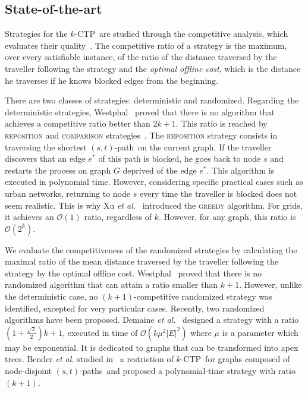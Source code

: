 \documentclass[11pt,letterpaper]{article}
\newcommand{\kctp}{$k$-CTP}
\newcommand{\card}[1]{\left| #1 \right|}
\newcommand{\stpath}{$(s,t)$-path}
\newcommand{\stpaths}{$(s,t)$-paths}
\begin{document}
\subsection{State-of-the-art}
Strategies for the \kctp ~are studied through the competitive analysis, which evaluates their quality~\cite{BoEl98}. The competitive ratio of a strategy is the maximum, over every satisfiable instance, of the ratio of the distance traversed by the traveller following the strategy and the \textit{optimal offline cost}, which is the distance he traverses if he knows blocked edges from the beginning. 

There are two classes of strategies: deterministic and randomized. Regarding the deterministic strategies, Westphal~\cite{We08} proved that there is no algorithm that achieves a competitive ratio better than $2k+1$. This ratio is reached by \textsc{reposition} and \textsc{comparison} strategies~\cite{We08,XuHuSuZh09}. The \textsc{reposition} strategy consists in traversing the shortest \stpath ~on the current graph. If the traveller discovers that an edge $e^*$ of this path is blocked, he goes back to node $s$ and restarts the process on graph $G$ deprived of the edge $e^*$. 
This algorithm is executed in polynomial time. However, considering specific practical cases such as urban networks, returning to node $s$ every time the traveller is blocked does not seem realistic. This is why Xu {\em et al.\/}~\cite{XuHuSuZh09} introduced the \textsc{greedy} algorithm. For grids, it achieves an $\mathcal{O}\left(1\right)$ ratio, regardless of $k$. However, for any graph, this ratio is $\mathcal{O}\left(2^k\right)$.

We evaluate the competitiveness of the randomized strategies by calculating the maximal ratio of the mean distance traversed by the traveller following the strategy by the optimal offline cost. Westphal~\cite{We08} proved that there is no randomized algorithm that can attain a ratio smaller than $k+1$. However, unlike the deterministic case, no $\left(k+1\right)$-competitive randomized strategy was identified, excepted for very particular cases. Recently, two randomized algorithms have been proposed. Demaine {\em et al.\/}~\cite{DeHuLiSa14} designed a strategy with a ratio $\left(1+\frac{\sqrt{2}}{2}\right)k+1$, executed in time of $\mathcal{O}\left(k\mu^2\card{E}^2\right)$ where $\mu$ is a parameter which may be exponential. It is dedicated to graphs that can be transformed into apex trees. 
Bender {\em et al.\/} studied in~\cite{BeWe15} a restriction of \kctp ~for graphs composed of node-disjoint \stpaths ~and proposed a polynomial-time strategy with ratio $\left(k+1\right)$. 
\end{document}
